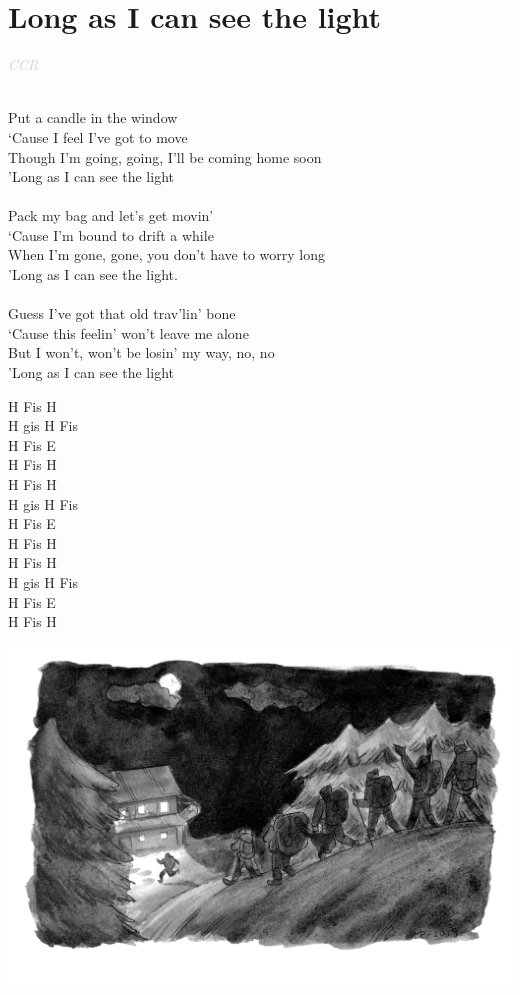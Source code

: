 \documentclass[a5paper, 10pt]{book}
\begin{document}
\section{Long as I can see the light}\textcolor{lightgray}{\textit{CCR}}\\~\\
\begin{minipage}[t]{0.8\textwidth}
Put a candle in the window\\
‘Cause I feel I've got to move\\
Though I'm going, going, I'll be coming home soon\\
'Long as I can see the light\\
\\
Pack my bag and let's get movin'\\
‘Cause I'm bound to drift a while\\
When I'm gone, gone, you don't have to worry long\\
'Long as I can see the light.\\
\\
Guess I've got that old trav'lin' bone\\
‘Cause this feelin' won't leave me alone\\
But I won't, won't be losin' my way, no, no\\
'Long as I can see the light\\
\end{minipage}
\begin{minipage}[t]{0.2\textwidth}
H Fis H\\
H gis H Fis\\
H Fis E\\
H Fis H\\

H Fis H\\
H gis H Fis\\
H Fis E\\
H Fis H\\

H Fis H\\
H gis H Fis\\
H Fis E\\
H Fis H\\
\end{minipage}
\vfill
\includegraphics[width=\textwidth, center]{images/long_as_i_can_see_the_light.png}\\
\end{document}
